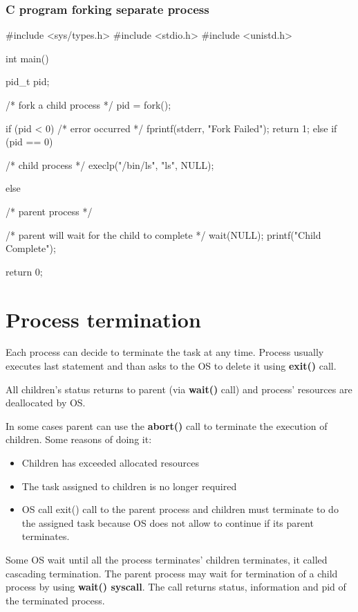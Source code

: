 \subsubsection{C program forking separate process}
\begin{codeInC}
#include <sys/types.h>
#include <stdio.h>
#include <unistd.h>

int main() {

  pid_t pid;

  /* fork a child process */
  pid = fork();

  if (pid < 0) { /* error occurred */
    fprintf(stderr, "Fork Failed");
    return 1;
  } else if (pid == 0) { /* child process */
    execlp("/bin/ls", "ls", NULL);

  } else { /* parent process */

    /* parent will wait for the child to complete */
    wait(NULL);
    printf("Child Complete");
  }  

  return 0;
}

\end{codeInC}


\newpage
\section{Process termination}

Each process can decide to terminate the task at any time. Process usually executes last statement and than asks to the OS to delete it using \textbf{ exit()} call.

All children's status returns to parent (via \textbf{wait()} call) and process' resources are deallocated by OS.

In some cases parent can use the \textbf{abort()} call to terminate the execution of children. Some reasons of doing it:

\begin{itemize}
    \item Children has exceeded allocated resources
    \item The task assigned to children is no longer required
    \item OS call exit() call to the parent process and children must terminate to do the assigned task because OS does not allow to continue if its parent terminates.
\end{itemize}

Some OS wait until all the process terminates' children terminates, it called cascading termination.
The parent process may wait for termination of a child process by using \textbf{wait() syscall}. The call returns status, information and pid of the terminated process.

